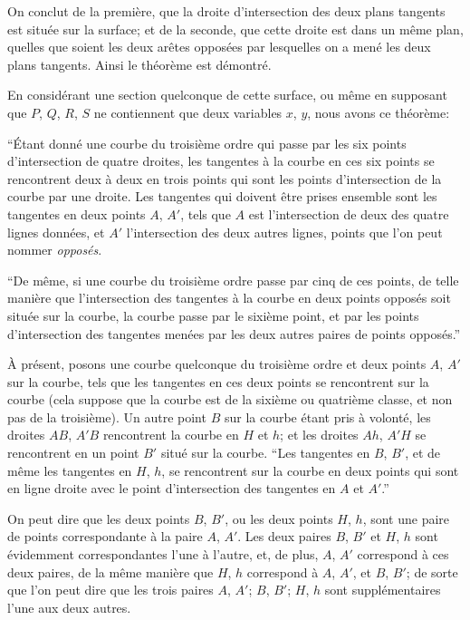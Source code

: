 \documentclass[12pt,a4paper]{article}
\begin{document}
On conclut de la premi\`ere, que la droite d'intersection des deux plans tangents est situ\'ee sur la surface; et de la seconde, que cette droite est dans un m\^eme plan, quelles que soient les deux ar\^etes oppos\'ees par lesquelles on a men\'e les deux plans tangents. Ainsi le th\'eor\`eme est d\'emontr\'e.

En consid\'erant une section quelconque de cette surface, ou m\^eme en supposant que $P$, $Q$, $R$, $S$ ne contiennent que deux variables $x$, $y$, nous avons ce th\'eor\`eme:

``\'Etant donn\'e une courbe du troisi\`eme ordre qui passe par les six points d'intersection de quatre droites, les tangentes \`a la courbe en ces six points se rencontrent deux \`a deux en trois points qui sont les points d'intersection de la courbe par une droite. Les tangentes qui doivent \^etre prises ensemble sont les tangentes en deux points $A$, $A'$, tels que $A$ est l'intersection de deux des quatre lignes donn\'ees, et $A'$ l'intersection des deux autres lignes, points que l'on peut nommer \textit{oppos\'es}.

``De m\^eme, si une courbe du troisi\`eme ordre passe par cinq de ces points, de telle mani\`ere que l'intersection des tangentes \`a la courbe en deux points oppos\'es soit situ\'ee sur la courbe, la courbe passe par le sixi\`eme point, et par les points d'intersection des tangentes men\'ees par les deux autres paires de points oppos\'es.''

\`A pr\'esent, posons une courbe quelconque du troisi\`eme ordre et deux points $A$, $A'$ sur la courbe, tels que les tangentes en ces deux points se rencontrent sur la courbe (cela suppose que la courbe est de la sixi\`eme ou quatri\`eme classe, et non pas de la troisi\`eme). Un autre point $B$ sur la courbe \'etant pris \`a volont\'e, les droites $AB$, $A'B$ rencontrent la courbe en $H$ et $h$; et les droites $Ah$, $A'H$ se rencontrent en un point $B'$ situ\'e sur la courbe. ``Les tangentes en $B$, $B'$, et de m\^eme les tangentes en $H$, $h$, se rencontrent sur la courbe en deux points qui sont en ligne droite avec le point d'intersection des tangentes en $A$ et $A'$.''

On peut dire que les deux points $B$, $B'$, ou les deux points $H$, $h$, sont une paire de points correspondante \`a la paire $A$, $A'$. Les deux paires $B$, $B'$ et $H$, $h$ sont \'evidemment correspondantes l'une \`a l'autre, et, de plus, $A$, $A'$ correspond \`a ces deux paires, de la m\^eme mani\`ere que $H$, $h$ correspond \`a $A$, $A'$, et $B$, $B'$; de sorte que l'on peut dire que les trois paires $A$, $A'$; $B$, $B'$; $H$, $h$ sont suppl\'ementaires l'une aux deux autres.
\end{document}
